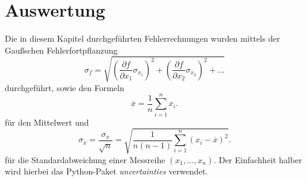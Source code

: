 \section{Auswertung}
\label{sec:Auswertung}

Die in diesem Kapitel durchgeführten Fehlerrechnungen wurden mittels der Gaußschen Fehlerfortpflanzung 
\begin{equation}
    \sigma_f = \sqrt{\left( \frac{\partial f}{\partial x_1} \sigma_{x_1} \right)^2 + \left( \frac{\partial f}{\partial x_2} \sigma_{x_2} \right)^2 + ...}
\end{equation}
durchgeführt, sowie den Formeln 
\begin{equation}
    \overline{x} = \frac{1}{n} \sum^n_{i=1}x_i . 
    \label{eq:mittelwert}
\end{equation}
für den Mittelwert und 
\begin{equation}
    \sigma_{\overline{x}} = \frac{\sigma_x}{\sqrt{n}} = \sqrt{\frac{1}{n(n-1)}  \sum^n_{i=1} \left( x_i - \overline{x}\right)^2 } .
    \label{eq:abweichung}
\end{equation}
für die Standardabweichung einer Messreihe $\left( x_1, ... , x_n  \right)$.
Der Einfachheit halber wird hierbei das Python-Paket \textit{uncertainties} verwendet. \cite{uncertainties} \\
\hspace{1cm}



\clearpage